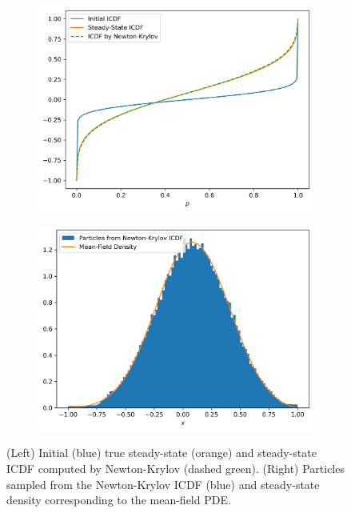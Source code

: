 \documentclass{article}
\begin{document}
\begin{figure}[h]
    \centering
    \begin{subfigure}[b]{0.51\textwidth}
        \centering
        \includegraphics[width=\textwidth]{figures/EconomicsICDF.png}
    \end{subfigure}%
    \begin{subfigure}[b]{0.51\textwidth}
        \centering
        \includegraphics[width=\textwidth]{figures/EconomicsICDFParticles.png}
    \end{subfigure}
    \caption{(Left) Initial (blue) true steady-state (orange) and steady-state ICDF computed by Newton-Krylov (dashed green). (Right) Particles sampled from the Newton-Krylov ICDF (blue) and steady-state density corresponding to the mean-field PDE.}
    \label{fig:economics_icdf}
\end{figure}
\end{document}
